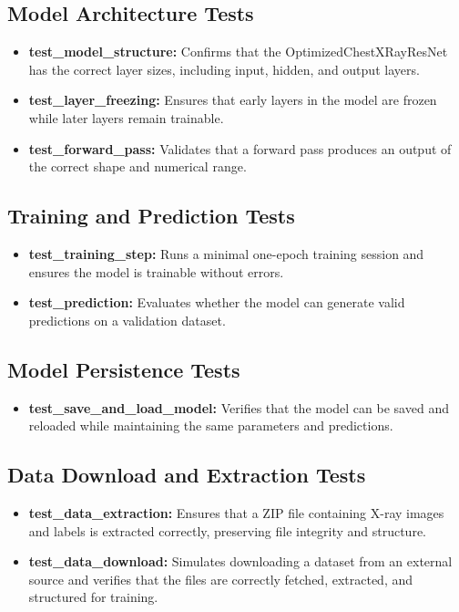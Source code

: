 \documentclass[12pt, titlepage]{article}
\begin{document}
\subsection{Model Architecture Tests}
\begin{itemize}
    \item \textbf{test\_model\_structure:} Confirms that the OptimizedChestXRayResNet has the correct layer sizes, including input, hidden, and output layers.
    \item \textbf{test\_layer\_freezing:} Ensures that early layers in the model are frozen while later layers remain trainable.
    \item \textbf{test\_forward\_pass:} Validates that a forward pass produces an output of the correct shape and numerical range.
\end{itemize}

\subsection{Training and Prediction Tests}
\begin{itemize}
    \item \textbf{test\_training\_step:} Runs a minimal one-epoch training session and ensures the model is trainable without errors.
    \item \textbf{test\_prediction:} Evaluates whether the model can generate valid predictions on a validation dataset.
\end{itemize}

\subsection{Model Persistence Tests}
\begin{itemize}
    \item \textbf{test\_save\_and\_load\_model:} Verifies that the model can be saved and reloaded while maintaining the same parameters and predictions.
\end{itemize}

\subsection{Data Download and Extraction Tests}
\begin{itemize}
    \item \textbf{test\_data\_extraction:} Ensures that a ZIP file containing X-ray images and labels is extracted correctly, preserving file integrity and structure.
    \item \textbf{test\_data\_download:} Simulates downloading a dataset from an external source and verifies that the files are correctly fetched, extracted, and structured for training.
\end{itemize}
\end{document}
